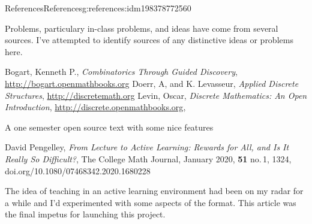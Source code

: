 \documentclass[oneside,10pt,]{book}
\newcommand{\xreffont}{\relax}
\numberwithin{equation}{section}
\begin{document}
\begin{references-chapter-numberless}{References}{}{References}{}{}{g:references:idm198378772560}
%
\begin{introduction}{}%
Problems, particulary in-class problems, and ideas have come from several sources.  I've attempted to identify sources of any distinctive ideas or problems here.%
\end{introduction}%
\begin{referencelist}
\hypertarget{x:biblio:biblio-bogart-2017}{}Bogart, Kenneth P., \textit{Combinatorics Through Guided Discovery}, \href{http://bogart.openmathbooks.org}{http:\slash{}\slash{}bogart.openmathbooks.org}
\hypertarget{x:biblio:biblio-doerr-2019}{}Doerr, A, and K. Levasseur, \textit{Applied Discrete Structures}, \href{http://discretemath.org}{http:\slash{}\slash{}discretemath.org}
\hypertarget{x:biblio:biblio-levin-2020}{}Levin, Oscar, \textit{Discrete Mathematics: An Open Introduction}, \href{http://discrete.openmathbooks.org}{http:\slash{}\slash{}discrete.openmathbooks.org}, \par%
A one semester open source text with some nice features%

\hypertarget{x:biblio:biblio-pengelley}{}David Pengelley, \textit{From Lecture to Active Learning: Rewards for All, and Is It Really So Difficult?}, The College Math Journal, January 2020, \textbf{51} no.\@\,1, 13\textendash{}24, doi.org\slash{}10.1080\slash{}07468342.2020.1680228\par%
The idea of teaching in an active learning environment had been on my radar for a while and I'd experimented with some aspects of the format. This article was the final impetus for launching this project.%

\end{referencelist}
\end{references-chapter-numberless}
%
{\xreffont\printindex}
%
\end{document}
